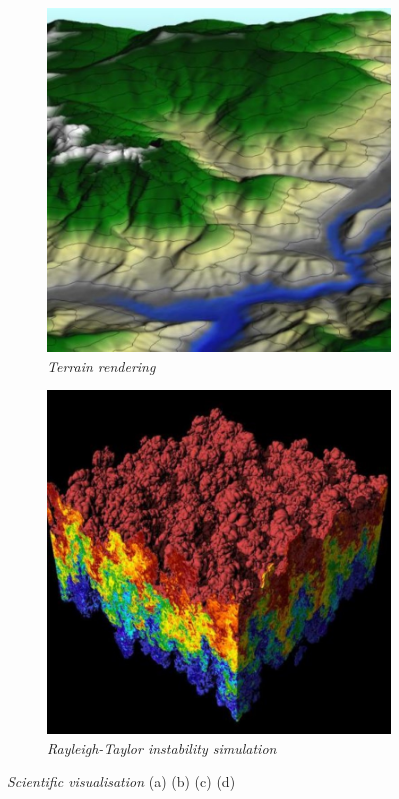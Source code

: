 \begin{figure}[!htb]
\begin{subfigure}{.5\textwidth}
  \includegraphics[scale=.20]{terrain.jpg}
  \caption{\emph{Terrain rendering} }
\end{subfigure}%
\begin{subfigure}{.5\textwidth}
  \centering
  \includegraphics[scale=.20]{RayleighTaylor.jpg}
  \caption{\emph{Rayleigh-Taylor instability simulation} }
\end{subfigure}
\caption{\textit{Scientific visualisation} (a)\citep{molecule} (b)\citep{medicalvis} (c)\citep{rayleightaylor}  (d)\citep{terrain}}
\label{fig:scientificvisualisations}
\end{figure}

